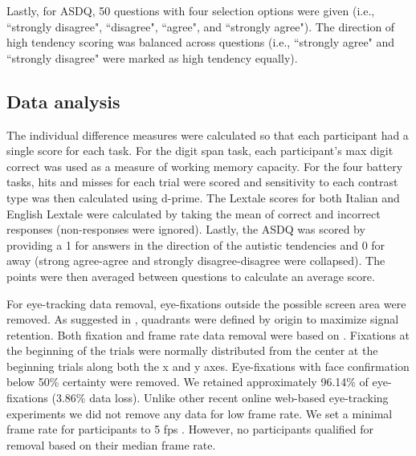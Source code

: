 Lastly, for ASDQ, 50 questions with four selection options were given (i.e., ``strongly disagree", ``disagree", ``agree", and ``strongly agree"). The direction of high tendency scoring was balanced across questions (i.e., ``strongly agree" and ``strongly disagree" were marked as high tendency equally).

\subsection{Data analysis}

The individual difference measures were calculated so that each participant had a single score for each task. For the digit span task, each participant's max digit correct was used as a measure of working memory capacity. For the four battery tasks, hits and misses for each trial were scored and sensitivity to each contrast type was then calculated using d-prime. The Lextale scores for both Italian and English Lextale were calculated by taking the mean of correct and incorrect responses (non-responses were ignored). Lastly, the ASDQ was scored by providing a 1 for answers in the direction of the autistic tendencies and 0 for away (strong agree-agree and strongly disagree-disagree were collapsed). The points were then averaged between questions to calculate an average score.

For eye-tracking data removal, eye-fixations outside the possible screen area were removed. As suggested in \cite{bramlett_wiener_24-AOW}, quadrants were defined by origin to maximize signal retention. Both fixation and frame rate data removal were based on \cite{bramlett_wiener_24-AOW}. Fixations at the beginning of the trials were normally distributed from the center at the beginning trials along both the x and y axes. Eye-fixations with face confirmation below 50\% certainty were removed. We retained approximately 96.14\% of eye-fixations (3.86\% data loss). Unlike other recent online web-based eye-tracking experiments we did not remove any data for low frame rate. We set a minimal frame rate for participants to 5 fps \citep{Vos_2017}. However, no participants qualified for removal based on their median frame rate. 